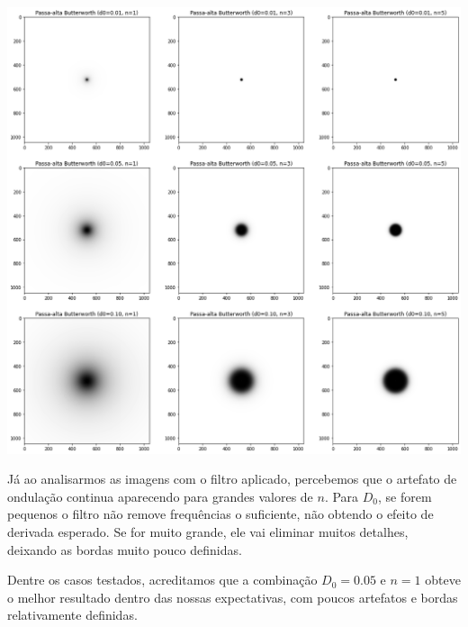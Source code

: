 \documentclass[12pt,a4paper]{article}
\begin{document}
\vspace{1em}
\begin{center}
	\includegraphics[width=\textwidth]{filtros_high_pass}
\end{center}
\vspace{1em}
        
Já ao analisarmos as imagens com o filtro aplicado, percebemos que o artefato de ondulação continua aparecendo para grandes valores de $n$. Para $D_0$, se forem pequenos o filtro não remove frequências o suficiente, não obtendo o efeito de derivada esperado. Se for muito grande, ele vai eliminar muitos detalhes, deixando as bordas muito pouco definidas.

Dentre os casos testados, acreditamos que a combinação $D_0 = 0.05$ e $n = 1$ obteve o melhor resultado dentro das nossas expectativas, com poucos artefatos e bordas relativamente definidas.
\end{document}
